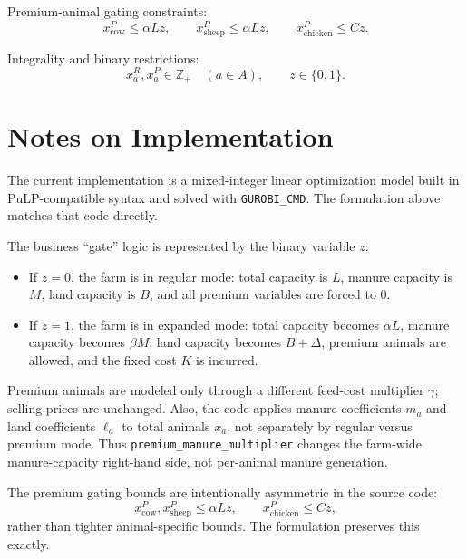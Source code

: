 Premium-animal gating constraints:
\[
x_{\mathrm{cow}}^{P} \le \alpha L z,
\qquad
x_{\mathrm{sheep}}^{P} \le \alpha L z,
\qquad
x_{\mathrm{chicken}}^{P} \le Cz.
\]

Integrality and binary restrictions:
\[
x_{a}^{R},x_{a}^{P}\in \mathbb{Z}_{+}\quad (a\in A),\qquad z\in\{0,1\}.
\]

\section*{Notes on Implementation}

The current implementation is a mixed-integer linear optimization model built in PuLP-compatible syntax and solved with \texttt{GUROBI\_CMD}. The formulation above matches that code directly.

The business ``gate'' logic is represented by the binary variable \(z\):
\begin{itemize}
    \item If \(z=0\), the farm is in regular mode: total capacity is \(L\), manure capacity is \(M\), land capacity is \(B\), and all premium variables are forced to \(0\).
    \item If \(z=1\), the farm is in expanded mode: total capacity becomes \(\alpha L\), manure capacity becomes \(\beta M\), land capacity becomes \(B+\Delta\), premium animals are allowed, and the fixed cost \(K\) is incurred.
\end{itemize}

Premium animals are modeled only through a different feed-cost multiplier \(\gamma\); selling prices are unchanged. Also, the code applies manure coefficients \(m_a\) and land coefficients \(\ell_a\) to total animals \(x_a\), not separately by regular versus premium mode. Thus \texttt{premium\_manure\_multiplier} changes the farm-wide manure-capacity right-hand side, not per-animal manure generation.

The premium gating bounds are intentionally asymmetric in the source code:
\[
x_{\mathrm{cow}}^{P},x_{\mathrm{sheep}}^{P}\le \alpha L z,
\qquad
x_{\mathrm{chicken}}^{P}\le Cz,
\]
rather than tighter animal-specific bounds. The formulation preserves this exactly.
